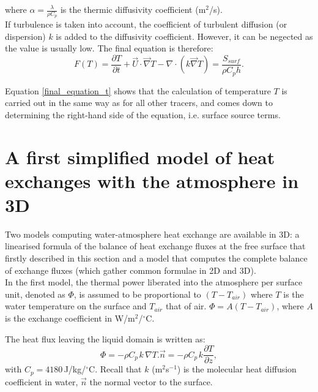 where $\alpha = \frac{\lambda}{\rho C_p}$ is the thermic diffusivity coefficient
(m$^2$/s).\\

If turbulence is taken into account, the coefficient of turbulent diffusion
(or dispersion) $k$ is added to the diffusivity coefficient.
However, it can be negected as the value is usually low.
The final equation is therefore:\\

\begin{equation}
  \label{final_equation_t}
  F(T) = \frac{\partial T}{\partial t} + \vec{U} \cdot \vec \nabla T
  - \nabla \cdot \left( k \vec \nabla T \right)
  = \frac{S_{surf}}{\rho C_p h}.
\end{equation}

Equation \ref{final_equation_t} shows that the calculation of temperature $T$
is carried out in the same way
as for all other tracers, and comes down to determining the right-hand side
of the equation, i.e. surface source terms.\\

\section{A first simplified model of heat exchanges with the atmosphere in 3D}

Two models computing water-atmosphere heat exchange are available
in 3D: a linearised formula of the balance of heat exchange fluxes at
the free surface that firstly described in this section
and a model that computes the
complete balance of exchange fluxes (which gather
common formulae in 2D and 3D).\\

In the first model, the thermal power liberated into the atmosphere per
surface unit, denoted as $\Phi$, is assumed to be proportional to $(T-T_{air})$
where $T$ is the water temperature on the surface and $T_{air}$ that of
air. $\Phi=A(T-T_{air})$, where $A$ is the exchange coefficient in
W/m$^{2}$/${^{\circ}}$C.

The heat flux leaving the liquid domain is written as:
\begin{equation}
\Phi=-\rho C_{p\,}k\,\nabla T.\vec{n}=-\rho
C_{p\,}k\dfrac{\partial T}{\partial z},
\end{equation}
with $C_{p}=4180\,$J/kg/${^{\circ}}$C. Recall that $k$ (m$^2$s$^{-1}$) is the
molecular heat diffusion coefficient in water, $\vec{n}$ the normal vector to the surface.

